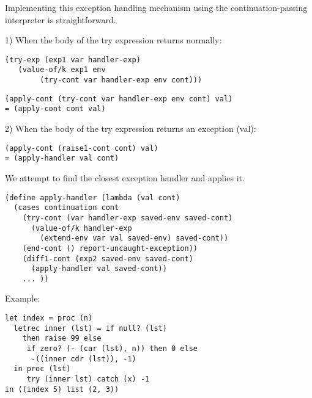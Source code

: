 \documentclass{article}
\begin{document}
\begin{huge}

Implementing this exception handling mechanism using the continuation-passing interpreter is straightforward.

1) When the body of the try expression returns normally:
\begin{lstlisting}
(try-exp (exp1 var handler-exp)
   (value-of/k exp1 env
        (try-cont var handler-exp env cont)))
\end{lstlisting}

\begin{lstlisting}
(apply-cont (try-cont var handler-exp env cont) val)
= (apply-cont cont val)
\end{lstlisting}


2) When the body of the try expression returns an exception (val):

\begin{lstlisting}
(apply-cont (raise1-cont cont) val)
= (apply-handler val cont)
\end{lstlisting}

We attempt to find the closest exception handler and applies it.
\begin{lstlisting}
(define apply-handler (lambda (val cont)
  (cases continuation cont
    (try-cont (var handler-exp saved-env saved-cont)
      (value-of/k handler-exp 
        (extend-env var val saved-env) saved-cont))
    (end-cont () report-uncaught-exception))
    (diff1-cont (exp2 saved-env saved-cont) 
      (apply-handler val saved-cont))
    ... ))
\end{lstlisting}


Example:

\begin{lstlisting}
let index = proc (n) 
  letrec inner (lst) = if null? (lst)
    then raise 99 else
     if zero? (- (car (lst), n)) then 0 else 
      -((inner cdr (lst)), -1)
  in proc (lst)
     try (inner lst) catch (x) -1
in ((index 5) list (2, 3))
\end{lstlisting}



\end{huge}
\end{document}
